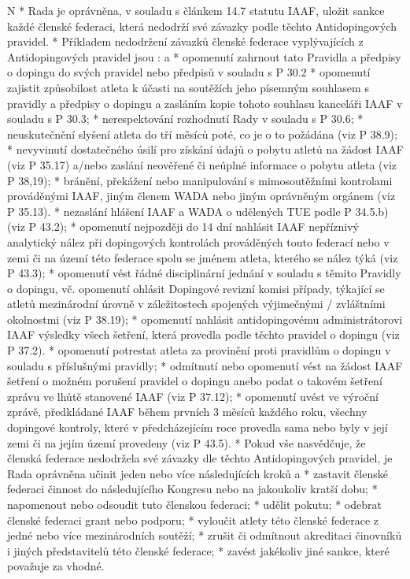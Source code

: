 \begitems \style N
* Rada je oprávněna, v souladu s článkem 14.7 statutu IAAF, uložit sankce každé členské federaci, která nedodrží své závazky podle těchto Antidopingových pravidel.
* Příkladem nedodržení závazků členské federace vyplývajících z Antidopingových pravidel jsou :
  \begitems \style a
  * opomenutí zahrnout tato Pravidla a předpisy o dopingu do svých pravidel nebo předpisů v souladu s P 30.2
  * opomenutí zajistit způsobilost atleta k účasti na soutěžích jeho písemným souhlasem s pravidly a předpisy o dopingu a zasláním kopie tohoto souhlasu kanceláři IAAF v souladu s P 30.3;
  * nerespektování rozhodnutí Rady v souladu s P 30.6;
  * neuskutečnění slyšení atleta do tří měsíců poté, co je o to požádána (viz P 38.9);
  * nevyvinutí dostatečného úsilí pro získání údajů o pobytu atletů na žádost IAAF (viz P 35.17) a/nebo zaslání neověřené či neúplné informace o pobytu atleta (viz P 38,19);
  * bránění, překážení nebo manipulování s mimosoutěžními kontrolami prováděnými IAAF, jiným členem WADA nebo jiným oprávněným orgánem (viz P 35.13).
  * nezaslání hlášení IAAF a WADA o udělených TUE podle P 34.5.b) (viz P 43.2);
  * opomenutí nejpozději do 14 dní nahlásit IAAF nepříznivý analytický nález při dopingových kontrolách prováděných touto federací nebo v zemi či na území této federace spolu se jménem atleta, kterého se nález týká (viz P 43.3);
  * opomenutí vést řádné disciplinární jednání v souladu s těmito Pravidly o dopingu, vč. opomenutí ohlásit Dopingové revizní komisi případy, týkající se atletů mezinárodní úrovně v záležitostech spojených výjimečnými / zvláštními okolnostmi (viz P 38.19);
  * opomenutí nahlásit antidopingovému administrátorovi IAAF výsledky všech šetření, která provedla podle těchto pravidel o dopingu (viz P 37.2).
  * opomenutí potrestat atleta za provinění proti pravidlům o dopingu v souladu s příslušnými pravidly;
  * odmítnutí nebo opomenutí vést na žádost IAAF šetření o možném porušení pravidel o dopingu anebo podat o takovém šetření zprávu ve lhůtě stanovené IAAF (viz P 37.12);
  * opomenutí uvést ve výroční zprávě, předkládané IAAF během prvních 3 měsíců každého roku, všechny dopingové kontroly, které v předcházejícím roce provedla sama nebo byly v její zemi či na jejím území provedeny (viz P 43.5).
  \enditems
* Pokud vše nasvědčuje, že členská federace nedodržela své závazky dle těchto Antidopingových pravidel, je Rada oprávněna učinit jeden nebo více následujících kroků
  \begitems \style a
  * zastavit členské federaci činnost do následujícího Kongresu nebo na jakoukoliv kratší dobu;
  * napomenout nebo odsoudit tuto členskou federaci;
  * udělit pokutu;
  * odebrat členské federaci grant nebo podporu;
  * vyloučit atlety této členské federace z jedné nebo více mezinárodních soutěží;
  * zrušit či odmítnout akreditaci činovníků i jiných představitelů této členské federace;
  * zavést jakékoliv jiné sankce, které považuje za vhodné.
  \enditems

